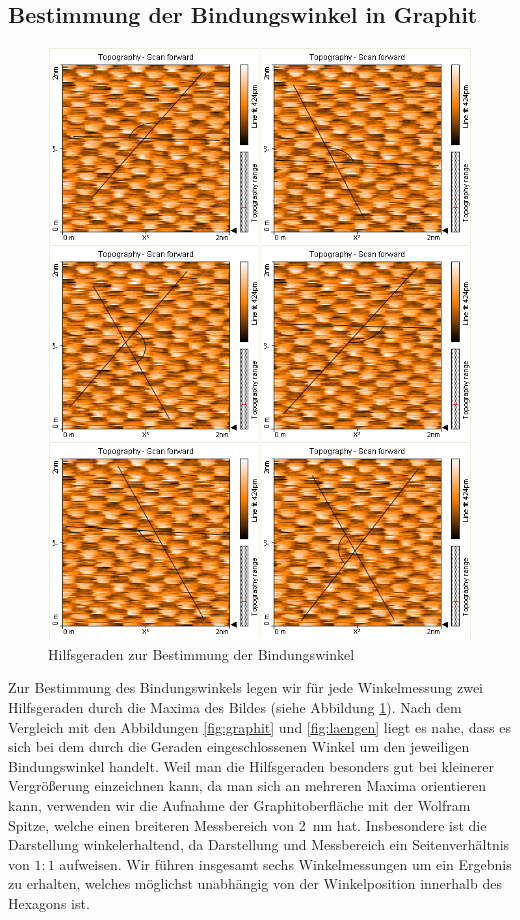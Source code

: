 \documentclass[10pt, a4paper]{article}
\begin{document}
\subsection{Bestimmung der Bindungswinkel in Graphit}
\begin{figure}[hp]
\centering
\includegraphics[width=1\textwidth]{./grafiken/collage.png}
\caption{Hilfsgeraden zur Bestimmung der Bindungswinkel}
\label{fig:hilfsgeraden}
\end{figure}
Zur Bestimmung des Bindungswinkels legen wir für jede Winkelmessung zwei Hilfsgeraden durch die Maxima des Bildes (siehe Abbildung \ref{fig:hilfsgeraden}).
Nach dem Vergleich mit den Abbildungen \ref{fig:graphit} und \ref{fig:laengen} liegt es nahe, dass es sich bei dem durch die Geraden eingeschlossenen Winkel um den jeweiligen Bindungswinkel handelt.
Weil man die Hilfsgeraden besonders gut bei kleinerer Vergrößerung einzeichnen kann, da man sich an mehreren Maxima orientieren kann, verwenden wir die Aufnahme der Graphitoberfläche mit der Wolfram Spitze, welche einen breiteren Messbereich von \SI{2}{\nano\metre} hat.
Insbesondere ist die Darstellung winkelerhaltend, da Darstellung und Messbereich ein Seitenverhältnis von $1:1$ aufweisen.
Wir führen insgesamt sechs Winkelmessungen um ein Ergebnis zu erhalten, welches möglichst unabhängig von der Winkelposition innerhalb des Hexagons ist.
\end{document}
